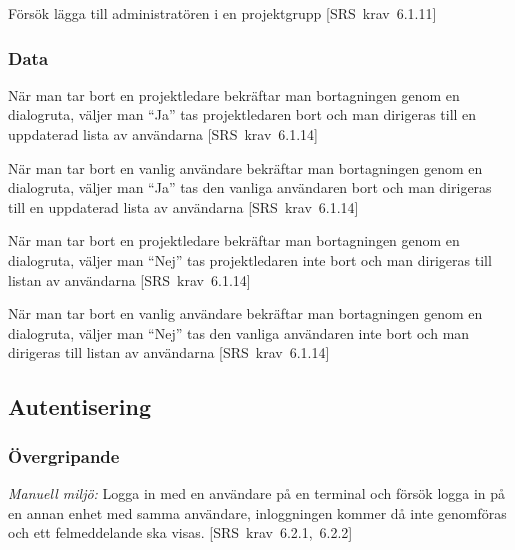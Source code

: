 \documentclass[a4paper]{article}
\def\reqinside{\hfil\penalty 100 \hfilneg \hbox}
\def \req [#1]{\reqinside{[SRS krav #1]}}
\begin{document}
\begin{appendices}
\begin{FT}
\item
Försök lägga till administratören i en projektgrupp \req[6.1.11]
\end{FT}

\subsubsection{Data}

\begin{FT}
\item När man tar bort en projektledare bekräftar man bortagningen genom en dialogruta, väljer man ``Ja'' tas projektledaren bort och man dirigeras till en uppdaterad lista av användarna \req[6.1.14]

\item När man tar bort en vanlig användare bekräftar man bortagningen genom en dialogruta, väljer man ``Ja'' tas den vanliga användaren bort och man dirigeras till en uppdaterad lista av användarna \req[6.1.14]

\item När man tar bort en projektledare bekräftar man bortagningen genom en dialogruta, väljer man ``Nej'' tas projektledaren inte bort och man dirigeras till listan av användarna \req[6.1.14]

\item När man tar bort en vanlig användare bekräftar man bortagningen genom en dialogruta, väljer man ``Nej'' tas den vanliga användaren inte bort och man dirigeras till listan av användarna \req[6.1.14]
\end{FT}







\subsection{Autentisering}
\subsubsection{Övergripande}

\begin{FT}
\item 
\emph{Manuell miljö:} Logga in med en användare på en terminal och försök logga in på en annan enhet med samma användare, inloggningen kommer då inte genomföras och ett felmeddelande ska visas. \req[6.2.1, 6.2.2]


\end{FT}
\end{appendices}
\end{document}
